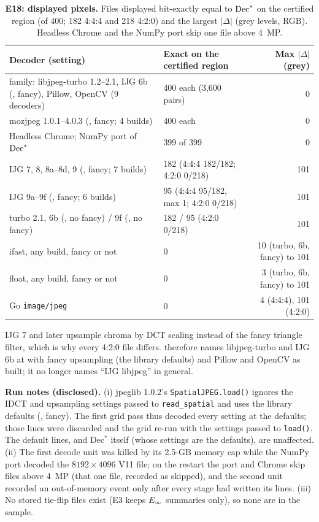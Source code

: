 \documentclass[10pt]{article}
\begin{document}
\begin{table}[!htbp]
\centering\tabsize
\caption{\textbf{E18: displayed pixels.} Files displayed bit-exactly equal to $\Dstar$ on the certified region (of 400; 182 4:4:4 and 218 4:2:0)
and the largest $|\Delta|$ (grey levels, RGB). Headless Chrome and the NumPy port skip one file above 4~MP.}
\label{tab:b1}
\begin{tabularx}{\textwidth}{@{}YL{4.6cm}r@{}}
\toprule
Decoder (setting) & Exact on the certified region & Max $|\Delta|$ (grey) \\
\midrule
{} family: libjpeg-turbo 1.2--2.1, IJG 6b (\islow{}, fancy), Pillow, OpenCV (9 decoders) & 400 each (3,600 pairs) & 0 \\
mozjpeg 1.0.1--4.0.3 (\islow{}, fancy; 4 builds) & 400 each & 0 \\
Headless Chrome; NumPy port of $\Dstar$ & 399 of 399 & 0 \\
IJG 7, 8, 8a--8d, 9 (\islow{}, fancy; 7 builds) & 182 (4:4:4 182/182; 4:2:0 0/218) & 101 \\
IJG 9a--9f (\islow{}, fancy; 6 builds) & 95 (4:4:4 95/182, max 1; 4:2:0 0/218) & 101 \\
turbo 2.1, 6b (\islow{}, no fancy) / 9f (\islow{}, no fancy) & 182 / 95 (4:2:0 0/218) & 101 \\
ifast, any build, fancy or not & 0 & 10 (turbo, 6b, fancy) to 101 \\
float, any build, fancy or not & 0 & 3 (turbo, 6b, fancy) to 101 \\
Go \texttt{image/jpeg} & 0 & 4 (4:4:4), 101 (4:2:0) \\
\bottomrule
\end{tabularx}
\end{table}
IJG 7 and later upsample chroma by DCT scaling instead of the fancy triangle filter, which is why every 4:2:0 file
differs.  therefore names libjpeg-turbo and IJG 6b at \islow{} with fancy upsampling (the library defaults) and
Pillow and OpenCV as built; it no longer names ``IJG libjpeg'' in general.

\textbf{Run notes (disclosed).} (i) jpeglib 1.0.2's \texttt{SpatialJPEG.load()} ignores the IDCT and upsampling
settings passed to \texttt{read\_spatial} and uses the library defaults (\islow{}, fancy). The first grid pass thus
decoded every setting at the defaults; those lines were discarded and the grid re-run with the settings passed to
\texttt{load()}. The default lines, and Dec$^*$ itself (whose settings are the defaults), are unaffected. (ii) The
first decode unit was killed by its 2.5-GB memory cap while the NumPy port decoded the $8192\times4096$ V11 file; on
the restart the port and Chrome skip files above 4~MP (that one file, recorded as skipped), and the second unit
recorded an out-of-memory event only after every stage had written its lines. (iii) No stored tie-flip files exist (E3
keeps $E_{\infty}$ summaries only), so none are in the sample.
\end{document}
